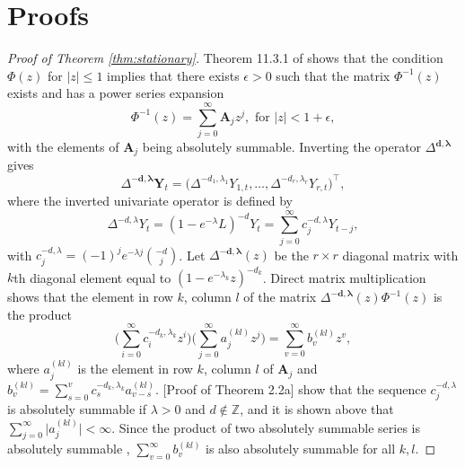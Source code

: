 \documentclass[11pt,english,oneside]{amsart}
\numberwithin{equation}{section}
\theoremstyle{plain}
\numberwithin{equation}{section}
\renewcommand{\v}[1]{\boldsymbol{#1}}
\begin{document}



\appendix


\section{Proofs}\label{app:proofs}
\begin{proof}[Proof of Theorem \ref{thm:stationary}]
    Theorem 11.3.1 of \cite{brockwell1991time} shows that the condition $\Phi(z)$ for $|z| \leq 1$ implies that there exists $\epsilon>0$ such that the matrix $\Phi^{-1}(z)$ exists and has a power series expansion
    \begin{equation*}
        \Phi^{-1}(z) = \sum_{j=0}^\infty \mathbf{A}_j z^j, \text{ for } |z|<1+\epsilon, 
    \end{equation*}
    with the elements of $\mathbf{A}_j$ being absolutely summable.
    Inverting the operator $\Delta^{\mathbf{d},\v \lambda}$ gives
    \begin{equation*}
        \Delta^{\mathbf{-d},\v \lambda}\mathbf{Y}_t = \Big(\Delta^{-d_1,\lambda_1}Y_{1,t},\ldots,\Delta^{-d_r,\lambda_r}Y_{r,t}\Big)^\top,
    \end{equation*}
    where the inverted univariate operator is defined by \citep{Sabzikar2019}
    \begin{equation*}
        \Delta^{-d,\lambda}Y_t = (1-e^{-\lambda}L)^{-d}Y_t = \sum_{j=0}^\infty c_j^{-d,\lambda}Y_{t-j},
    \end{equation*}
    with $c_j^{-d,\lambda}=(-1)^j e^{-\lambda j}\binom{-d}{j}$. 
    Let $\Delta^{-\mathbf{d},\v \lambda}(z)$ be the $r \times r$ diagonal matrix with $k$th diagonal element equal to $(1-e^{-\lambda_k}z)^{-d_k}$.
    Direct matrix multiplication shows that the element in row $k$, column $l$ of the matrix $\Delta^{\mathbf{-d},\v \lambda}(z)\Phi^{-1}(z)$ is the product
    \begin{equation*}
        \Big(\sum_{i=0}^\infty c_i^{-d_k,\lambda_k} z^i \Big)
        \Big(\sum_{j=0}^\infty a_j^{(kl)} z^j \Big) = \sum_{v=0}^\infty b_v^{(kl)} z^v,  
    \end{equation*}
    where $a_j^{(kl)}$ is the element in row $k$, column $l$ of  $\mathbf{A}_j$ and $b_v^{(kl)} = \sum_{s=0}^v c_s^{-d_k,\lambda_k} a_{v-s}^{(kl)}$. \cite{Sabzikar2019}[Proof of Theorem 2.2a] show that the sequence $c_j^{-d,\lambda}$ is absolutely summable if $\lambda >0$ and $d \notin \mathbb{Z}$, and it is shown above that $\sum_{j=0}^\infty \vert a_j^{(kl)}\vert<\infty$. Since the product of two absolutely summable series is absolutely summable \citep[Ch. 4.17]{knopp1990theory}, $\sum_{v=0}^\infty b_v^{(kl)}$ is also absolutely summable for all $k,l$.


\end{proof}
\end{document}
